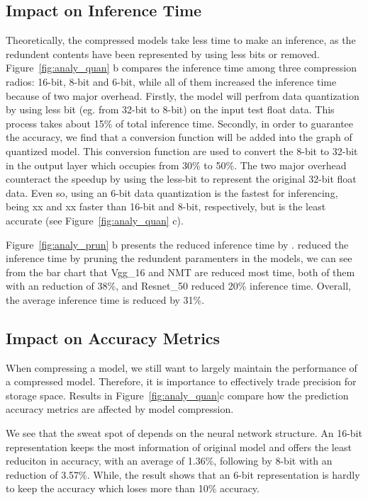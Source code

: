 \subsection{Impact on Inference Time}
Theoretically, the compressed models take less time to make an inference, as 
the redundent contents have been represented by using less bits or removed.
Figure~\ref{fig:analy_quan} b compares the inference time
among three compression radios: 16-bit, 8-bit and 6-bit, while all of them 
increased the inference time because of two major overhead.
Firstly, the model will perfrom data quantization by using less bit (eg. from 32-bit to 8-bit) on
the input test float data. This process takes about 15\% of total inference time.
Secondly, in order to guarantee the accuracy, we find that a conversion function will be added into 
the graph of quantized model. This conversion function are used to convert the 8-bit to 32-bit in the output layer which 
occupies from 30\% to 50\%.
The two major overhead counteract the speedup by using the less-bit to represent the original 32-bit float data. 
Even so, using an 6-bit data quantization is the fastest for inferencing,
being xx and xx faster than 16-bit and 8-bit, respectively, 
but is the least accurate (see Figure~\ref{fig:analy_quan} c). 

Figure~\ref{fig:analy_prun} b presents the reduced inference time by \pruning.
\pruning reduced the inference time by pruning the redundent paramenters in the models,
we can see from the bar chart that
Vgg\_16 and NMT are reduced most time, both of them with an reduction of 38\%, and 
Resnet\_50 reduced 20\% inference time. Overall, the average inference time is reduced by 31\%.


\subsection{Impact on Accuracy Metrics}
When compressing a model, we still want to largely maintain the performance of a compressed model. Therefore, it is importance to
effectively trade precision for storage space. Results in Figure~\ref{fig:analy_quan}c compare how the prediction accuracy metrics are affected by model
compression.

We see that the sweat spot of \quantization depends on the neural network structure. 
An 16-bit representation keeps the most information of original model and offers the least reduciton in accuracy,
with an average of 1.36\%, following by 8-bit with an reduction of 3.57\%.
While, the result shows that an 6-bit representation is hardly to keep the accuracy which loses more than 10\% accuracy.

